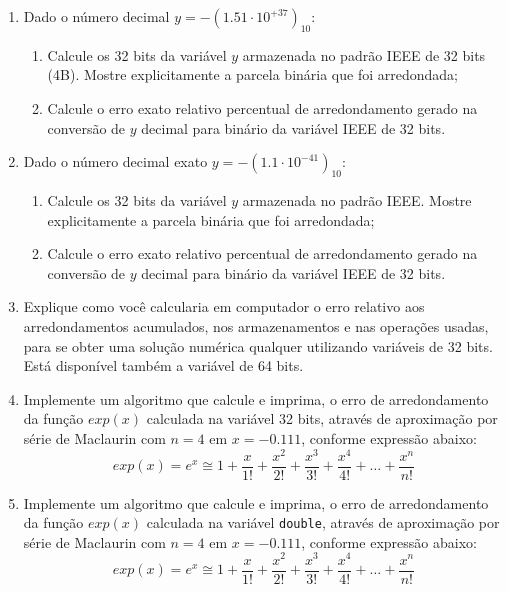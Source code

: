 \documentclass[12pt]{article}
\newenvironment{smallitem}{
    \vspace{-2mm}
    \begin{enumerate}
    \setlength{\parskip}{0pt}
    \setlength{\itemsep}{2pt}
}{
    \vspace{-2mm}
    \end{enumerate}
}
\begin{document}
\begin{enumerate}[label=\textbf{\arabic*})]
\item Dado o número decimal $y = -(1.51 \cdot 10^{+37})_{10}$:

\begin{smallitem}

\item Calcule os 32 bits da variável $y$ armazenada no padrão IEEE de 32 bits
(4B). Mostre explicitamente a parcela binária que foi arredondada;

\item Calcule o erro exato relativo percentual de arredondamento gerado na
conversão de $y$ decimal para binário da variável IEEE de 32 bits.

\end{smallitem}

\item Dado o número decimal exato $y = -(1.1 \cdot 10^{-41})_{10}$:

\begin{smallitem}

\item Calcule os 32 bits da variável $y$ armazenada no padrão IEEE. Mostre
explicitamente a parcela binária que foi arredondada;

\item Calcule o erro exato relativo percentual de arredondamento gerado na
conversão de $y$ decimal para binário da variável IEEE de 32 bits.

\end{smallitem}

\item Explique como você calcularia em computador o erro relativo aos
arredondamentos acumulados, nos armazenamentos e nas operações usadas, para se
obter uma solução numérica qualquer utilizando variáveis de 32 bits. Está
disponível também a variável de 64 bits.

\item Implemente um algoritmo que calcule e imprima, o erro de arredondamento da
função $exp(x)$ calculada na variável 32 bits, através de aproximação por série
de Maclaurin com $n = 4$ em $x = -0.111$, conforme expressão abaixo:
\begin{equation*}
exp(x) = e^x \cong 1 + \frac{x}{1!} + \frac{x^2}{2!} + \frac{x^3}{3!} +
\frac{x^4}{4!} + \dots + \frac{x^n}{n!}
\end{equation*}

\item Implemente um algoritmo que calcule e imprima, o erro de arredondamento da
função $exp(x)$ calculada na variável \verb!double!, através de aproximação por
série de Maclaurin com $n = 4$ em $x = -0.111$, conforme expressão abaixo:
\begin{equation*}
exp(x) = e^x \cong 1 + \frac{x}{1!} + \frac{x^2}{2!} + \frac{x^3}{3!} +
\frac{x^4}{4!} + \dots + \frac{x^n}{n!}
\end{equation*}

\end{enumerate}
\end{document}
